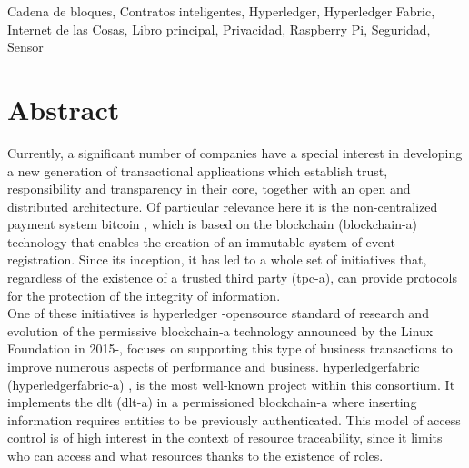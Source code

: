 \documentclass[12pt,a4paper, twoside]{report}
\newcommand{\blankpage}{
				\newpage
				\thispagestyle{empty}
				\mbox{}
				\newpage
				}
\begin{document}
	Cadena de bloques, Contratos inteligentes, Hyperledger, Hyperledger Fabric, Internet de las Cosas, Libro principal, Privacidad, Raspberry Pi, Seguridad, Sensor
			
	\blankpage
	
	\chapter*{Abstract}
	\thispagestyle{empty}
		
	\vspace{-0.3cm}

	Currently, a significant number of companies have a special interest in developing a new generation of transactional applications which establish trust, responsibility and transparency in their core, together with an open and distributed architecture. Of particular relevance here it is the non-centralized payment system \gls{bitcoin} \cite{bitcoin}, which is based on the \Gls{blockchain} (\gls{blockchain-a}) \cite{iansiti:2017:ttab} technology that enables the creation of an immutable system of event registration. Since its inception, it has led to a whole set of initiatives that, regardless of the existence of a trusted third party (\gls{tpc-a}), can provide protocols for the protection of the integrity of information. \\
		
	One of these initiatives is \gls{hyperledger} \cite{hyperledger:url} -\gls{opensource} standard of research and evolution of the permissive \gls{blockchain-a} technology announced by the Linux Foundation in 2015-, focuses on supporting this type of business \glspl{transaction} to improve numerous aspects of performance and business. \gls{hyperledgerfabric} (\gls{hyperledgerfabric-a}) \cite{hyperledgerfabric:url}, is the most well-known project within this consortium. It implements the \gls{dlt} (\gls{dlt-a}) \cite{wattenhofer:DLT} in a permissioned \gls{blockchain-a} where inserting information requires entities to be previously authenticated. This model of access control is of high interest in the context of resource traceability, since it limits who can access and what resources thanks to the existence of roles. \\
	
\end{document}

